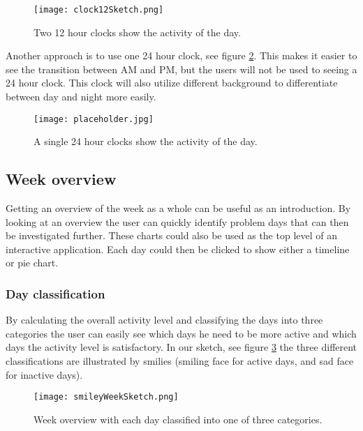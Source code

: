 \begin{figure}[h!]
	\centering
		\texttt{[image: clock12Sketch.png]}
		\caption{\footnotesize Two 12 hour clocks show the activity of the day.}
		\label{fig:clock12}
\end{figure}

Another approach is to use one 24 hour clock, see figure \ref{fig:clock24}. This makes it easier to see the transition between AM and PM, but the users will not be used to seeing a 24 hour clock. This clock will also utilize different background to differentiate between day and night more easily.

\begin{figure}[h!]
	\centering
		\texttt{[image: placeholder.jpg]}
		\caption{\footnotesize A single 24 hour clocks show the activity of the day.}
		\label{fig:clock24}
\end{figure}


\subsection{Week overview}
Getting an overview of the week as a whole can be useful as an introduction. By looking at an overview the user can quickly identify problem days that can then be investigated further. These charts could also be used as the top level of an interactive application. Each day could then be clicked to show either a timeline or pie chart. 

\subsubsection{Day classification}
By calculating the overall activity level and classifying the days into three categories the user can easily see which days he need to be more active and which days the activity level is satisfactory. In our sketch, see figure \ref{fig:smileyWeek} the three different classifications are illustrated by smilies (smiling face for active days, and sad face for inactive days).

\begin{figure}[h!]
	\centering
		\texttt{[image: smileyWeekSketch.png]}
		\caption{\footnotesize Week overview with each day classified into one of three categories.}
		\label{fig:smileyWeek}
\end{figure}

